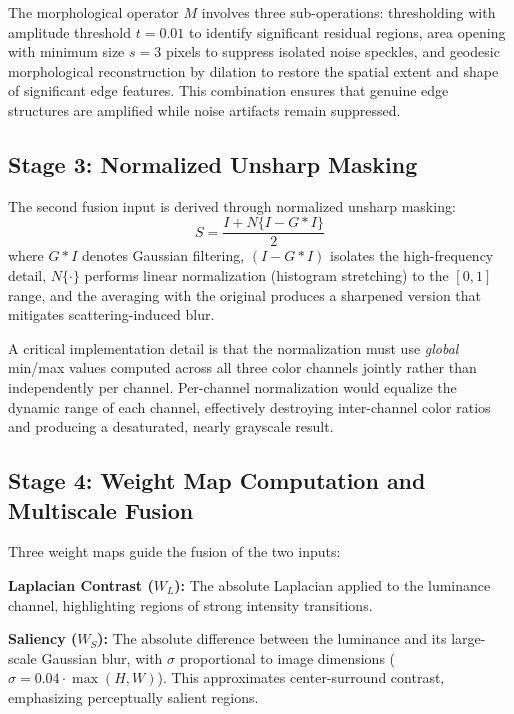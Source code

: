 \documentclass[conference]{IEEEtran}
\begin{document}
The morphological operator $M$ involves three sub-operations: thresholding with amplitude threshold $t = 0.01$ to identify significant residual regions, area opening with minimum size $s = 3$ pixels to suppress isolated noise speckles, and geodesic morphological reconstruction by dilation to restore the spatial extent and shape of significant edge features. This combination ensures that genuine edge structures are amplified while noise artifacts remain suppressed.

\subsection{Stage 3: Normalized Unsharp Masking}

The second fusion input is derived through normalized unsharp masking:
\begin{equation}
    S = \frac{I + N\{I - G * I\}}{2}
    \label{eq:unsharp}
\end{equation}
where $G * I$ denotes Gaussian filtering, $(I - G * I)$ isolates the high-frequency detail, $N\{\cdot\}$ performs linear normalization (histogram stretching) to the $[0, 1]$ range, and the averaging with the original produces a sharpened version that mitigates scattering-induced blur.

A critical implementation detail is that the normalization must use \textit{global} min/max values computed across all three color channels jointly rather than independently per channel. Per-channel normalization would equalize the dynamic range of each channel, effectively destroying inter-channel color ratios and producing a desaturated, nearly grayscale result.

\subsection{Stage 4: Weight Map Computation and Multiscale Fusion}

Three weight maps guide the fusion of the two inputs:

\textbf{Laplacian Contrast ($W_L$):} The absolute Laplacian applied to the luminance channel, highlighting regions of strong intensity transitions.

\textbf{Saliency ($W_S$):} The absolute difference between the luminance and its large-scale Gaussian blur, with $\sigma$ proportional to image dimensions ($\sigma = 0.04 \cdot \max(H, W)$). This approximates center-surround contrast, emphasizing perceptually salient regions.
\end{document}
